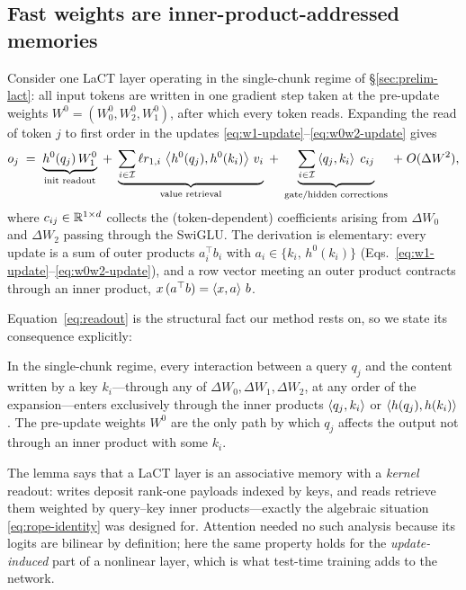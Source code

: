 \subsection{Fast weights are inner-product-addressed memories}
\label{sec:method-memory}

Consider one LaCT layer operating in the single-chunk regime of
\S\ref{sec:prelim-lact}: all input tokens are written in one gradient step
taken at the pre-update weights $W^0 = (W_0^0, W_2^0, W_1^0)$, after which
every token reads. Expanding the read of token $j$ to first order in the
updates \eqref{eq:w1-update}--\eqref{eq:w0w2-update} gives
\begin{equation}
\label{eq:readout}
o_j
\;=\;
\underbrace{h^0(q_j)\, W_1^0}_{\text{init readout}}
\;+\;
\underbrace{\sum_{i \in \mathcal{I}} \ell r_{1,i}\,
   \left\langle h^0(q_j), h^0(k_i) \right\rangle\, v_i}_{\text{value retrieval}}
\;+\;
\underbrace{\sum_{i \in \mathcal{I}}
   \left\langle q_j, k_i \right\rangle\; c_{ij}}_{\text{gate/hidden corrections}}
\;+\; O(\Delta W^2),
\end{equation}
where $c_{ij} \in \mathbb{R}^{1 \times d}$ collects the (token-dependent)
coefficients arising from $\Delta W_0$ and $\Delta W_2$ passing through the
SwiGLU. The derivation is elementary: every update is a sum of outer
products $a_i^\top b_i$ with $a_i \in \{k_i,\, h^0(k_i)\}$
(Eqs.~\ref{eq:w1-update}--\ref{eq:w0w2-update}), and a row vector meeting an
outer product contracts through an inner product,
$x\, (a^\top b) = \left\langle x, a \right\rangle\, b$.

Equation~\eqref{eq:readout} is the structural fact our method rests on, so
we state its consequence explicitly:

\begin{lemma}
\label{lem:addressing}
In the single-chunk regime, every interaction between a query $q_j$ and the
content written by a key $k_i$---through any of $\Delta W_0, \Delta W_1,
\Delta W_2$, at any order of the expansion---enters exclusively through the
inner products $\left\langle q_j, k_i \right\rangle$ or $\left\langle h(q_j), h(k_i) \right\rangle$. The pre-update
weights $W^0$ are the only path by which $q_j$ affects the output not
through an inner product with some $k_i$.
\end{lemma}

The lemma says that a LaCT layer is an associative memory with a
\emph{kernel} readout: writes deposit rank-one payloads indexed by keys, and
reads retrieve them weighted by query--key inner products---exactly the
algebraic situation \eqref{eq:rope-identity} was designed for. Attention
needed no such analysis because its logits are bilinear by definition; here
the same property holds for the \emph{update-induced} part of a nonlinear
layer, which is what test-time training adds to the network.

